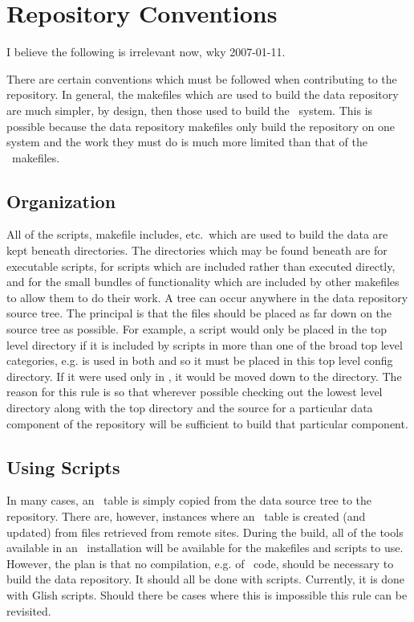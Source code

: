 
\section{Repository Conventions}
\label{data repository conventions}

I believe the following is irrelevant now, wky 2007-01-11.

There are certain conventions which must be followed when contributing to
the repository. In general, the makefiles which are used to build the
data repository are much simpler, by design, then those used to build
the \aipspp\ system. This is possible because the data repository makefiles
only build the repository on one system and the work they must do is much
more limited than that of the \aipspp\ makefiles.

\subsection*{Organization}
All of the scripts, makefile includes, etc.~which are used to build the data
are kept beneath  directories. The directories which may be
found beneath  are  for executable scripts,
 for scripts which are included rather than executed directly,
and  for the small bundles of functionality which are
included by other makefiles to allow them to do their work. A 
tree can occur anywhere in the data repository source tree. The principal
is that the  files should be placed as far down on the
source tree as possible. For example, a script would only be placed in
the top level  directory if it is included
by scripts in more than one of the broad top level categories, e.g.
 is used in both  and
 so it must be placed in this top level config directory.
If it were used only in , it would be moved down to
the  directory. The reason for this
rule is so that wherever possible checking out the lowest level 
directory along with the top  directory and the source for a
particular data component of the repository will be sufficient to build
that particular component.

\subsection*{Using Scripts}
In many cases, an \aipspp\ table is simply copied from the data source
tree to the repository. There are, however, instances where an
\aipspp\ table is created (and updated) from files retrieved from remote sites.
During the build, all of the tools available in an \aipspp\ installation
will be available for the makefiles and scripts to use. However,
the plan is that no compilation, e.g. of \cplusplus\ code, should be
necessary to build the data repository. It should all be done with
scripts. Currently, it is done with Glish scripts. Should there be
cases where this is impossible this rule can be revisited.

